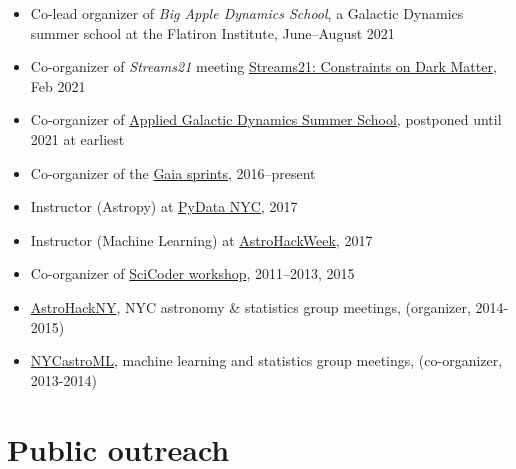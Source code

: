 \documentclass[12pt, letterpaper]{apw-cv}
\begin{document}
\begin{itemize}
    \item Co-lead organizer of \textit{Big Apple Dynamics School}, a Galactic Dynamics summer school at the Flatiron Institute, June--August 2021
    \item Co-organizer of \textit{Streams21} meeting \href{https://stellarstreams.org/streams21}{Streams21: Constraints on Dark Matter}, Feb 2021
    \item Co-organizer of \href{http://galacticdynamics.nyc/}{Applied Galactic Dynamics Summer School}, postponed until 2021 at earliest
    \item Co-organizer of the \href{http://gaia.lol}{Gaia sprints}, 2016--present
    \item Instructor (Astropy) at \href{http://pydata.org/nyc2017}{PyData NYC}, 2017
    \item Instructor (Machine Learning) at \href{http://astrohackweek.org}{AstroHackWeek}, 2017
    \item Co-organizer of \href{http://scicoder.org}{SciCoder workshop}, 2011--2013, 2015
    \item \href{https://groups.google.com/forum/#!forum/astrohackny}{AstroHackNY}, NYC astronomy \& statistics group meetings, (organizer, 2014-2015)
    \item \href{https://github.com/adrn/nycastroml}{NYCastroML}, machine learning and statistics group meetings, (co-organizer, 2013-2014)
\end{itemize}

\section*{Public outreach}
\end{document}
